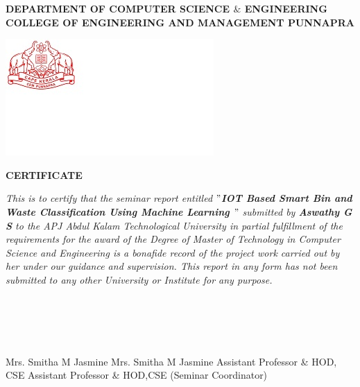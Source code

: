 



\begin{titlepage}
	\begin{center}
		\textbf{DEPARTMENT OF COMPUTER SCIENCE $\&$ ENGINEERING}\\[0.5cm]
		\textbf{ COLLEGE OF ENGINEERING AND MANAGEMENT PUNNAPRA}\\
		\vspace{1cm}
			\begin{center}
	\hspace{5cm}
	    	\includegraphics[]{am2.jpg}
	\end{center}
		\vspace{1cm}
		\textbf{CERTIFICATE}\\
	\end{center}
	\textit{\emph{This is to certify that the seminar report entitled {\textbf{$"$IOT Based Smart Bin and Waste Classification Using Machine Learning $"$}} submitted  by \textbf{Aswathy G S} to the APJ Abdul Kalam Technological University in partial fulfillment of the requirements for the award of the Degree of Master of Technology in Computer Science and Engineering is a bonafide record of the project work carried out by her under our guidance and supervision. This report in any form  has not been submitted to any other University or Institute for any purpose. }}\\\\\\\\\\\\
	
	
	
	Mrs. Smitha M Jasmine
	\hspace{5cm}
	Mrs. Smitha M Jasmine
	\newline \hspace{1cm}Assistant Professor \& HOD, CSE
	\hspace{3cm}	
	Assistant Professor \& HOD,CSE
	\newline\hspace{4cm} (Seminar Coordinator)
	
\hspace{6cm}
	
	

\end{titlepage}



